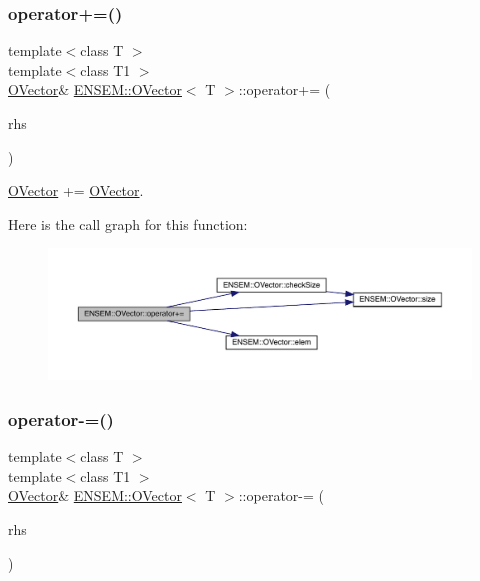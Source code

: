 \subsubsection{\texorpdfstring{operator+=()}{operator+=()}\hspace{0.1cm}{\footnotesize\ttfamily [6/6]}}
{\footnotesize\ttfamily template$<$class T $>$ \\
template$<$class T1 $>$ \\
\mbox{\hyperlink{classENSEM_1_1OVector}{O\+Vector}}\& \mbox{\hyperlink{classENSEM_1_1OVector}{E\+N\+S\+E\+M\+::\+O\+Vector}}$<$ T $>$\+::operator+= (\begin{DoxyParamCaption}\item[{const \mbox{\hyperlink{classENSEM_1_1OVector}{O\+Vector}}$<$ T1 $>$ \&}]{rhs }\end{DoxyParamCaption})\hspace{0.3cm}{\ttfamily [inline]}}



\mbox{\hyperlink{classENSEM_1_1OVector}{O\+Vector}} += \mbox{\hyperlink{classENSEM_1_1OVector}{O\+Vector}}. 

Here is the call graph for this function\+:
\nopagebreak
\begin{figure}[H]
\begin{center}
\leavevmode
\includegraphics[width=350pt]{d0/d8d/classENSEM_1_1OVector_a5ecd1c4c6a2e7d9a6a3e5189b3a22ba5_cgraph}
\end{center}
\end{figure}
\mbox{\label{classENSEM_1_1OVector_ae2ae62360c5eb29827cb7e3d5556859f}} 
\subsubsection{\texorpdfstring{operator-\/=()}{operator-=()}\hspace{0.1cm}{\footnotesize\ttfamily [1/6]}}
{\footnotesize\ttfamily template$<$class T $>$ \\
template$<$class T1 $>$ \\
\mbox{\hyperlink{classENSEM_1_1OVector}{O\+Vector}}\& \mbox{\hyperlink{classENSEM_1_1OVector}{E\+N\+S\+E\+M\+::\+O\+Vector}}$<$ T $>$\+::operator-\/= (\begin{DoxyParamCaption}\item[{const \mbox{\hyperlink{classENSEM_1_1OScalar}{O\+Scalar}}$<$ T1 $>$ \&}]{rhs }\end{DoxyParamCaption})\hspace{0.3cm}{\ttfamily [inline]}}



